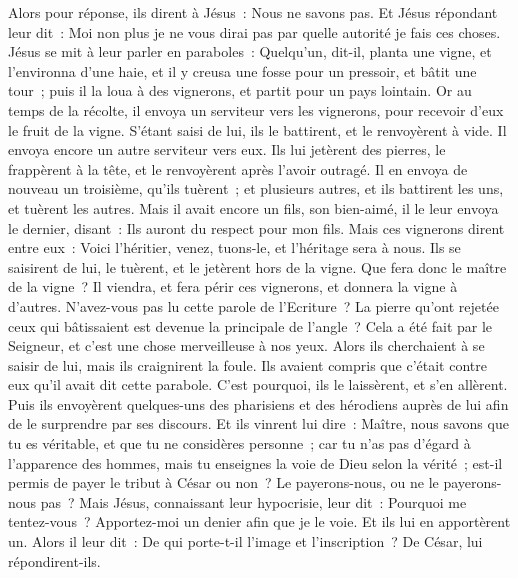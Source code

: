 \begin{multicols}{2}
Alors pour réponse, ils dirent à Jésus~: Nous ne savons pas. Et Jésus répondant leur dit~: Moi non plus je ne vous dirai pas par quelle autorité je fais ces choses.
\VerseOne{}Jésus se mit à leur parler en paraboles~: Quelqu'un, dit-il, planta une vigne, et l'environna d'une haie, et il y creusa une fosse pour un pressoir, et bâtit une tour~; puis il la loua à des vignerons, et partit pour un pays lointain.
Or au temps de la récolte, il envoya un serviteur vers les vignerons, pour recevoir d'eux le fruit de la vigne.
S'étant saisi de lui, ils le battirent, et le renvoyèrent à vide.
Il envoya encore un autre serviteur vers eux. Ils lui jetèrent des pierres, le frappèrent à la tête, et le renvoyèrent après l'avoir outragé.
Il en envoya de nouveau un troisième, qu'ils tuèrent~; et plusieurs autres, et ils battirent les uns, et tuèrent les autres.
Mais il avait encore un fils, son bien-aimé, il le leur envoya le dernier, disant~: Ils auront du respect pour mon fils.
Mais ces vignerons dirent entre eux~: Voici l'héritier, venez, tuons-le, et l'héritage sera à nous.
Ils se saisirent de lui, le tuèrent, et le jetèrent hors de la vigne.
Que fera donc le maître de la vigne~? Il viendra, et fera périr ces vignerons, et donnera la vigne à d'autres.
N'avez-vous pas lu cette parole de l'Ecriture~? La pierre qu'ont rejetée ceux qui bâtissaient est devenue la principale de l'angle~?
Cela a été fait par le Seigneur, et c'est une chose merveilleuse à nos yeux.
Alors ils cherchaient à se saisir de lui, mais ils craignirent la foule. Ils avaient compris que c'était contre eux qu'il avait dit cette parabole. C'est pourquoi, ils le laissèrent, et s'en allèrent.
Puis ils envoyèrent quelques-uns des pharisiens et des hérodiens auprès de lui afin de le surprendre par ses discours.
Et ils vinrent lui dire~: Maître, nous savons que tu es véritable, et que tu ne considères personne~; car tu n'as pas d'égard à l'apparence des hommes, mais tu enseignes la voie de Dieu selon la vérité~; est-il permis de payer le tribut à César ou non~? Le payerons-nous, ou ne le payerons-nous pas~?
Mais Jésus, connaissant leur hypocrisie, leur dit~: Pourquoi me tentez-vous~? Apportez-moi un denier afin que je le voie.
Et ils lui en apportèrent un. Alors il leur dit~: De qui porte-t-il l'image et l'inscription~? De César, lui répondirent-ils.

\end{multicols}

